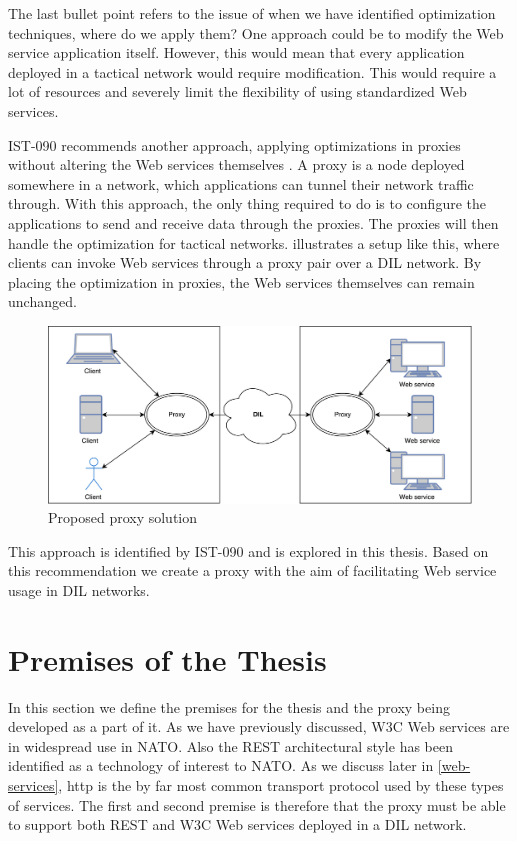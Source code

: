 The last bullet point refers to the issue of when we have identified
optimization techniques, where do we apply them? One approach could be to modify
the Web service application itself. However, this would mean that every
application deployed in a tactical network would require modification. This
would require a lot of resources and severely limit the flexibility of using
standardized Web services.

IST-090 recommends another approach, applying optimizations in proxies without
altering the Web services themselves \cite{ist-090}. A proxy is a node deployed
somewhere in a network, which applications can tunnel their network traffic
through. With this approach, the only thing required to do is to configure the
applications to send and receive data through the proxies. The proxies will then
handle the optimization for tactical networks.
 illustrates a setup like this, where
clients can invoke Web services through a proxy pair over a DIL network. By
placing the optimization in proxies, the Web services themselves can remain
unchanged.

\begin{figure}[h] \includegraphics[scale=0.5]{images/proposed_solution.pdf}
\caption{Proposed proxy solution} \label{figure-proposed-proxy-solution}
\end{figure}

This approach is identified by IST-090 and is explored in this thesis. Based on
this recommendation we create a proxy with the aim of facilitating Web service
usage in DIL networks.


\section{Premises of the Thesis}

In this section we define the premises for the thesis and the proxy being
developed as a part of it. As we have previously discussed, W3C Web services are
in widespread use in NATO. Also the REST architectural style has been identified
as a technology of interest to NATO. As we discuss later in \cref{web-services},
\gls{http} is the by far most common transport protocol used by these types of
services. The first and second premise is therefore that the proxy must be able
to support both REST and W3C Web services deployed in a DIL network.

